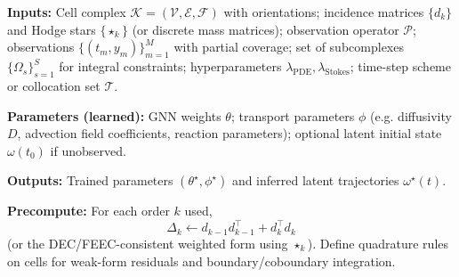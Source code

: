 \documentclass[10pt,article]{article}
\begin{document}
\noindent\textbf{Inputs:}
Cell complex $\mathcal{K}=(\mathcal{V},\mathcal{E},\mathcal{F})$ with orientations;
incidence matrices $\{d_k\}$ and Hodge stars $\{\star_k\}$ (or discrete mass matrices);
observation operator $\mathcal{P}$;
observations $\{(t_m, y_m)\}_{m=1}^M$ with partial coverage;
set of subcomplexes $\{\Omega_s\}_{s=1}^S$ for integral constraints;
hyperparameters $\lambda_{\mathrm{PDE}},\lambda_{\mathrm{Stokes}}$;
time-step scheme or collocation set $\mathcal{T}$.

\noindent\textbf{Parameters (learned):}
GNN weights $\theta$;
transport parameters $\phi$ (e.g. diffusivity $D$, advection field coefficients, reaction parameters);
optional latent initial state $\omega(t_0)$ if unobserved.

\noindent\textbf{Outputs:}
Trained parameters $(\theta^\star,\phi^\star)$ and inferred latent trajectories $\omega^\star(t)$.

\medskip
\noindent\textbf{Precompute:}
For each order $k$ used,
\[
\Delta_k \leftarrow d_{k-1}d_{k-1}^\top + d_k^\top d_k
\]
(or the DEC/FEEC-consistent weighted form using $\star_k$).
Define quadrature rules on cells for weak-form residuals and boundary/coboundary integration.
\end{document}
